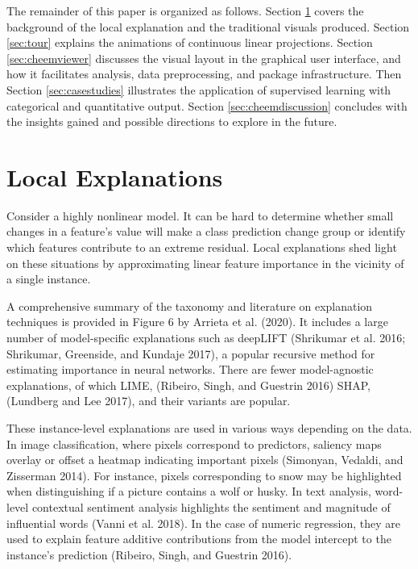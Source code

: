 \documentclass[11pt,twoside]{article}
\begin{document}
The remainder of this paper is organized as follows. Section \ref{sec:explanations} covers the background of the local explanation and the traditional visuals produced. Section \ref{sec:tour} explains the animations of continuous linear projections. Section \ref{sec:cheemviewer} discusses the visual layout in the graphical user interface, and how it facilitates analysis, data preprocessing, and package infrastructure. Then Section \ref{sec:casestudies} illustrates the application of supervised learning with categorical and quantitative output. Section \ref{sec:cheemdiscussion} concludes with the insights gained and possible directions to explore in the future.

\hypertarget{sec:explanations}{%
\section{Local Explanations}\label{sec:explanations}}

Consider a highly nonlinear model. It can be hard to determine whether small changes in a feature's value will make a class prediction change group or identify which features contribute to an extreme residual. Local explanations shed light on these situations by approximating linear feature importance in the vicinity of a single instance.

A comprehensive summary of the taxonomy and literature on explanation techniques is provided in Figure 6 by Arrieta et al. (2020). It includes a large number of model-specific explanations such as deepLIFT (Shrikumar et al. 2016; Shrikumar, Greenside, and Kundaje 2017), a popular recursive method for estimating importance in neural networks. There are fewer model-agnostic explanations, of which LIME, (Ribeiro, Singh, and Guestrin 2016) SHAP, (Lundberg and Lee 2017), and their variants are popular.

These instance-level explanations are used in various ways depending on the data. In image classification, where pixels correspond to predictors, saliency maps overlay or offset a heatmap indicating important pixels (Simonyan, Vedaldi, and Zisserman 2014). For instance, pixels corresponding to snow may be highlighted when distinguishing if a picture contains a wolf or husky. In text analysis, word-level contextual sentiment analysis highlights the sentiment and magnitude of influential words (Vanni et al. 2018). In the case of numeric regression, they are used to explain feature additive contributions from the model intercept to the instance's prediction (Ribeiro, Singh, and Guestrin 2016).
\end{document}
